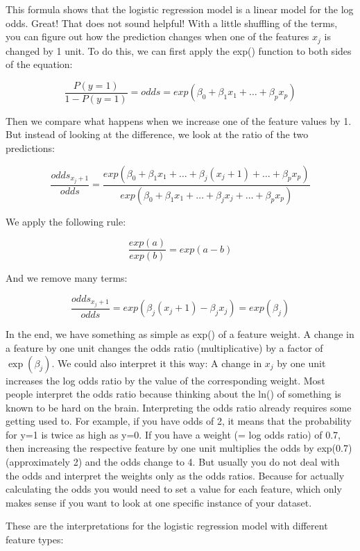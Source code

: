 \documentclass[
  10pt,
]{scrbook}
\begin{document}
This formula shows that the logistic regression model is a linear model for the log odds.
Great!
That does not sound helpful!
With a little shuffling of the terms, you can figure out how the prediction changes when one of the features \(x_j\) is changed by 1 unit.
To do this, we can first apply the exp() function to both sides of the equation:

\[\frac{P(y=1)}{1-P(y=1)}=odds=exp\left(\beta_{0}+\beta_{1}x_{1}+\ldots+\beta_{p}x_{p}\right)\]

Then we compare what happens when we increase one of the feature values by 1.
But instead of looking at the difference, we look at the ratio of the two predictions:

\[\frac{odds_{x_j+1}}{odds}=\frac{exp\left(\beta_{0}+\beta_{1}x_{1}+\ldots+\beta_{j}(x_{j}+1)+\ldots+\beta_{p}x_{p}\right)}{exp\left(\beta_{0}+\beta_{1}x_{1}+\ldots+\beta_{j}x_{j}+\ldots+\beta_{p}x_{p}\right)}\]

We apply the following rule:

\[\frac{exp(a)}{exp(b)}=exp(a-b)\]

And we remove many terms:

\[\frac{odds_{x_j+1}}{odds}=exp\left(\beta_{j}(x_{j}+1)-\beta_{j}x_{j}\right)=exp\left(\beta_j\right)\]

In the end, we have something as simple as exp() of a feature weight.
A change in a feature by one unit changes the odds ratio (multiplicative) by a factor of \(\exp(\beta_j)\).
We could also interpret it this way:
A change in \(x_j\) by one unit increases the log odds ratio by the value of the corresponding weight.
Most people interpret the odds ratio because thinking about the ln() of something is known to be hard on the brain.
Interpreting the odds ratio already requires some getting used to.
For example, if you have odds of 2, it means that the probability for y=1 is twice as high as y=0.
If you have a weight (= log odds ratio) of 0.7, then increasing the respective feature by one unit multiplies the odds by exp(0.7) (approximately 2) and the odds change to 4.
But usually you do not deal with the odds and interpret the weights only as the odds ratios.
Because for actually calculating the odds you would need to set a value for each feature, which only makes sense if you want to look at one specific instance of your dataset.

These are the interpretations for the logistic regression model with different feature types:
\end{document}
